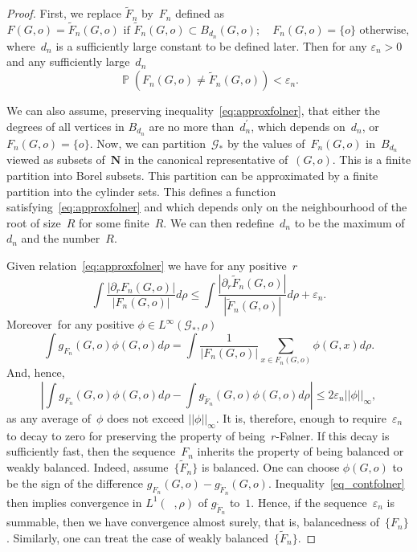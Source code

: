 \documentclass[10pt,a4paper]{amsart}
\DeclareMathOperator{\mbbP}{{\mathbb{P}}}
\DeclareMathOperator{\Gr}{{\mathcal{G}_*}}
\newcommand*{\field}[1]{\mathbf{#1}} %
\newcommand*\N{\field{N}} %
\newcommand*\eps{\varepsilon}
\begin{document}
\begin{proof}
    First, we replace $\tilde F_n$ by~$F_n$ defined as 
    $$ F(G,o)= \tilde F_n(G,o) \text{ if } \tilde F_n(G,o) \subset B_{d_n}(G,o); \quad 
    F_n(G,o) = \{o\} \text{ otherwise},$$ 
    where~$d_n$ is a sufficiently large constant to be defined later. Then for any $\eps_n > 0$ and any sufficiently large~$d_n$
    \begin{equation}\label{eq:approxfolner}
        \mbbP \left( F_n(G,o) \not = \tilde F_n(G,o) \right) < \eps_n.
    \end{equation}

    We can also assume, preserving inequality~\eqref{eq:approxfolner}, that either the degrees of all vertices in $B_{d_n}$ are no more than~$d^\prime_n$, which depends on~$d_n$, or $F_n(G,o) = \{o\}$. Now, we can partition~$\mathcal{G_*}$ by the values of~$F_n(G,o)$ in~$B_{d_n}$ viewed as subsets of~$\N$ in the canonical representative of~$(G,o)$. This is a finite partition into Borel subsets. This partition can be approximated by a finite partition into the cylinder sets. This defines a function satisfying~\eqref{eq:approxfolner} and which depends only on the neighbourhood of the root of size~$R$ for some finite~$R$. We can then redefine~$d_n$ to be the maximum of~$d_n$ and the number~$R$. 

    Given relation~\eqref{eq:approxfolner} we have for any positive~$r$
    $$
     \int \frac{|\partial_r F_n (G,o)|}{|F_n(G,o)|} d\rho \le \int \frac{|\partial_r\tilde F_n (G,o)|}{|\tilde F_n(G,o)|} d\rho + \eps_n.
    $$
    Moreover~for any positive $\phi \in L^\infty(\mathcal{G}_*, \rho)$
    $$
    \int g_{F_n}(G,o)\phi(G,o) d\rho  = \int \frac{1}{|F_n(G,o)|} \sum_{x \in F_n(G,o)} \phi(G,x) d\rho.
    $$
    And, hence, 
    \begin{equation}\label{eq_contfolner}
        \left| \int g_{F_n}(G,o)\phi(G,o) d\rho  - \int g_{\tilde F_n}(G,o)\phi(G,o) d\rho \right| \le 2\eps_n ||\phi||_\infty,
    \end{equation}
    as any average of~$\phi$ does not exceed $||\phi||_\infty$. It is, therefore, enough to require~$\eps_n$ to decay to zero for preserving the property of being~$r$-F\o lner. If this decay is sufficiently fast, then the sequence~$F_n$ inherits the property of being balanced or weakly balanced. Indeed, assume~$\{\tilde F_n\}$ is balanced. One can choose $\phi (G,o)$ to be the sign of the difference $g_{F_n}(G,o) - g_{\tilde F_n}(G,o)$. Inequality~\ref{eq_contfolner} then implies convergence in $L^1(\Gr, \rho)$ of $g_{\tilde F_n}$ to~$1$. Hence, if the sequence~$\eps_n$ is summable, then we have convergence almost surely, that is, balancedness of~$\{F_n\}$. Similarly, one can treat the case of weakly balanced~$\{\tilde F_n\}$.
\end{proof}
\end{document}
